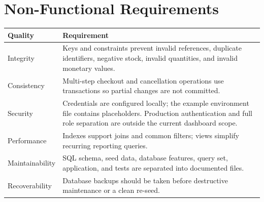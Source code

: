 \documentclass[11pt,a4paper,oneside]{report}
\begin{document}
\section{Non-Functional Requirements}
\begin{longtable}{P{0.20\textwidth}P{0.72\textwidth}}
\toprule
\textbf{Quality} & \textbf{Requirement}\\\midrule
Integrity & Keys and constraints prevent invalid references, duplicate identifiers, negative stock, invalid quantities, and invalid monetary values.\\
Consistency & Multi-step checkout and cancellation operations use transactions so partial changes are not committed.\\
Security & Credentials are configured locally; the example environment file contains placeholders. Production authentication and full role separation are outside the current dashboard scope.\\
Performance & Indexes support joins and common filters; views simplify recurring reporting queries.\\
Maintainability & SQL schema, seed data, database features, query set, application, and tests are separated into documented files.\\
Recoverability & Database backups should be taken before destructive maintenance or a clean re-seed.\\
\bottomrule
\end{longtable}
\end{document}
